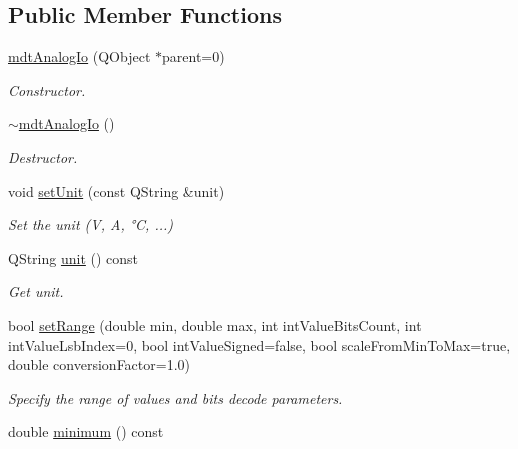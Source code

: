 \subsection*{Public Member Functions}
\begin{DoxyCompactItemize}
\item 
\hypertarget{classmdt_analog_io_affcdf039a10023b495cf49a5f476f829}{
\hyperlink{classmdt_analog_io_affcdf039a10023b495cf49a5f476f829}{mdtAnalogIo} (QObject $\ast$parent=0)}
\label{classmdt_analog_io_affcdf039a10023b495cf49a5f476f829}

\begin{DoxyCompactList}\small\item\em Constructor. \end{DoxyCompactList}\item 
\hypertarget{classmdt_analog_io_a7ec3c075b1d49c2d0917c09e4950b856}{
\hyperlink{classmdt_analog_io_a7ec3c075b1d49c2d0917c09e4950b856}{$\sim$mdtAnalogIo} ()}
\label{classmdt_analog_io_a7ec3c075b1d49c2d0917c09e4950b856}

\begin{DoxyCompactList}\small\item\em Destructor. \end{DoxyCompactList}\item 
\hypertarget{classmdt_analog_io_afb4cd82bee1ac1e77148c8621b1c66fa}{
void \hyperlink{classmdt_analog_io_afb4cd82bee1ac1e77148c8621b1c66fa}{setUnit} (const QString \&unit)}
\label{classmdt_analog_io_afb4cd82bee1ac1e77148c8621b1c66fa}

\begin{DoxyCompactList}\small\item\em Set the unit (V, A, °C, ...) \end{DoxyCompactList}\item 
\hypertarget{classmdt_analog_io_a126d5b9bf4a0bb9ce9f2ff6a010fef0e}{
QString \hyperlink{classmdt_analog_io_a126d5b9bf4a0bb9ce9f2ff6a010fef0e}{unit} () const }
\label{classmdt_analog_io_a126d5b9bf4a0bb9ce9f2ff6a010fef0e}

\begin{DoxyCompactList}\small\item\em Get unit. \end{DoxyCompactList}\item 
bool \hyperlink{classmdt_analog_io_a026624e890e4f2084c88377a6e4f1b47}{setRange} (double min, double max, int intValueBitsCount, int intValueLsbIndex=0, bool intValueSigned=false, bool scaleFromMinToMax=true, double conversionFactor=1.0)
\begin{DoxyCompactList}\small\item\em Specify the range of values and bits decode parameters. \end{DoxyCompactList}\item 
\hypertarget{classmdt_analog_io_acd2b8cb33d5d42abf23672ad7675825e}{
double \hyperlink{classmdt_analog_io_acd2b8cb33d5d42abf23672ad7675825e}{minimum} () const }
\label{classmdt_analog_io_acd2b8cb33d5d42abf23672ad7675825e}


\end{DoxyCompactItemize}
